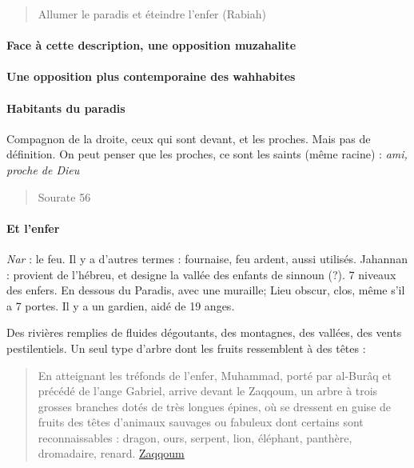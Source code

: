\begin{quote}
    Allumer le paradis et éteindre l'enfer (Rabiah)
\end{quote}

\paragraph{Face à cette description, une opposition muzahalite}

\paragraph{Une opposition plus contemporaine des wahhabites}

\paragraph{Habitants du paradis}
Compagnon de la droite, ceux qui sont devant, et les proches. Mais pas de définition. On peut penser que les proches, ce sont les saints (même racine) : \textit{ami, proche de Dieu}
\begin{quote}

    Sourate 56
\end{quote}


\paragraph{Et l'enfer} \textit{Nar} : le feu. Il y a d'autres termes : fournaise, feu ardent, aussi utilisés. Jahannan : provient de l'hébreu, et designe la vallée des enfants de  sinnoun (?). 7 niveaux des enfers. En dessous du Paradis, avec une muraille; Lieu obscur, clos, même s'il a 7 portes. Il y a un gardien, aidé de 19 anges.

Des rivières remplies de fluides dégoutants, des montagnes, des vallées, des vents pestilentiels. Un seul type d'arbre dont les fruits ressemblent à des têtes : 
\begin{quote}
    En atteignant les tréfonds de l’enfer, Muhammad, porté par al-Burâq et précédé de l’ange Gabriel, arrive devant le Zaqqoum, un arbre à trois grosses branches dotés de très longues épines, où se dressent en guise de fruits des têtes d’animaux sauvages ou fabuleux dont certains sont reconnaissables : dragon, ours, serpent, lion, éléphant, panthère, dromadaire, renard. \href{https://krapooarboricole.wordpress.com/2014/04/03/une-curiosite-de-lenfer-musulman-larbre-zaqqoum/}{Zaqqoum}
\end{quote}

